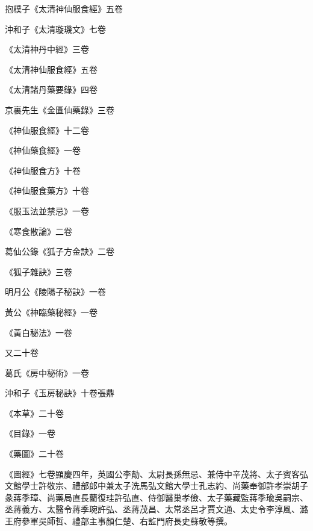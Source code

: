 \begin{pinyinscope}
 抱樸子《太清神仙服食經》五卷



 沖和子《太清璇璣文》七卷



 《太清神丹中經》三卷



 《太清神仙服食經》五卷



 《太清諸丹藥要錄》四卷



 京裏先生《金匱仙藥錄》三卷



 《神仙服食經》十二卷



 《神仙藥食經》一卷



 《神仙服食方》十卷



 《神仙服食藥方》十卷



 《服玉法並禁忌》一卷



 《寒食散論》二卷



 葛仙公錄《狐子方金訣》二卷



 《狐子雜訣》三卷



 明月公《陵陽子秘訣》一卷



 黃公《神臨藥秘經》一卷



 《黃白秘法》一卷



 又二十卷



 葛氏《房中秘術》一卷



 沖和子《玉房秘訣》十卷張鼎



 《本草》二十卷



 《目錄》一卷



 《藥圖》二十卷



 《圖經》七卷顯慶四年，英國公李勣、太尉長孫無忌、兼侍中辛茂將、太子賓客弘文館學士許敬宗、禮部郎中兼太子洗馬弘文館大學士孔志約、尚藥奉御許孝崇胡子彖蔣季璋、尚藥局直長藺復珪許弘直、侍御醫巢孝儉、太子藥藏監蔣季瑜吳嗣宗、丞蔣義方、太醫令蔣季琬許弘、丞蔣茂昌、太常丞呂才賈文通、太史令李淳風、潞王府參軍吳師哲、禮部主事顏仁楚、右監門府長史蘇敬等撰。




\end{pinyinscope}
